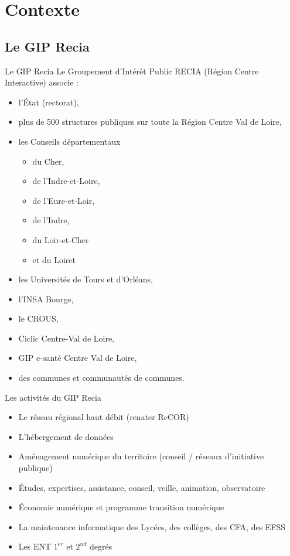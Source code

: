 \section{Contexte}
\subsection{Le GIP Recia}
 \begin{frame}{Le GIP Recia}
	Le Groupement d’Intérêt Public RECIA (Région Centre Interactive) associe : 
\begin{itemize}
\item l’État (rectorat),
\item plus de 500 structures publiques sur toute la Région Centre Val de Loire,
\item les Conseils départementaux 
	\begin{itemize}
		\item du Cher,
		\item de l’Indre-et-Loire,
		\item de l’Eure-et-Loir,
		\item de l'Indre, 
		\item du Loir-et-Cher 
		\item et du Loiret
	\end{itemize}
\item les Universités de Tours et d’Orléans,
\item l’INSA Bourge, 
\item le CROUS, 
\item Ciclic Centre-Val de Loire, 
\item GIP e-santé Centre Val de Loire, 
\item des communes et communautés de communes.
\end{itemize}
	
 \end{frame}
\begin{frame}{Les activités du GIP Recia }
\begin{itemize}
\item Le réseau régional haut débit (renater ReCOR)
\item L’hébergement de données
\item Aménagement numérique du territoire (conseil / réseaux d’initiative publique)
\item Études, expertises, assistance, conseil, veille, animation, observatoire
\item Économie numérique et programme transition numérique
\item La maintenance informatique des Lycées, des collèges, des CFA, des EFSS
\item Les ENT $1^{er}$ et $2^{nd}$ degrés
\end{itemize}
\end{frame}

